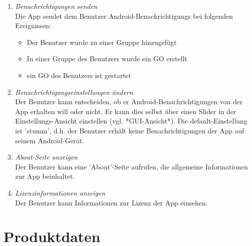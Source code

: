 \documentclass[parskip=full]{scrartcl}
\def\threedigits#1{%
  \ifnum#1<100 0\fi
  \ifnum#1<10 0\fi
  \number#1}
\begin{document}
\begin{enumerate}[label={\textbf{/F\protect\threedigits{\theenumi}0/}}, leftmargin=*, resume]	
 \item \colorbox{shadecolor}{\textit{Benachrichtigungen senden}}\label{Benachrichtigungen senden}\\
	Die App sendet dem Benutzer \glspl{Android-Benachrichtigung} bei folgenden Ereignissen:
	\begin{itemize}
		\item Der Benutzer wurde zu einer Gruppe hinzugefügt
		\item In einer Gruppe des Benutzers wurde ein GO erstellt
		\item ein GO des Benutzers ist gestartet
	\end{itemize}
	\item \colorbox{shadecolor}{\textit{Benachrichtigungseinstellungen ändern}}\label{Benachrichtigungseinstellungen ändern} \\
	Der Benutzer kann entscheiden, ob er Android-Benachrichtigungen von der App erhalten will oder nicht. Er kann dies selbst über einen Slider in der Einstellungs-Ansicht einstellen (vgl. *GUI-Ansicht*). Die default-Einstellung ist 'stumm', d.h. der Benutzer erhält keine Benachrichtigungen der App auf seinem Android-Gerät.
	\item \textit{About-Seite anzeigen}\label{About} \\
	Der Benutzer kann eine 'About'-Seite aufrufen, die allgemeine Informationen zur App beinhaltet.
	\item \textit{Lizenzinformationen anzeigen}\label{Lizenz} \\
	Der Benutzer kann Informationen zur Lizenz der App einsehen.
\end{enumerate}

\newpage
\section{Produktdaten}
\end{document}
